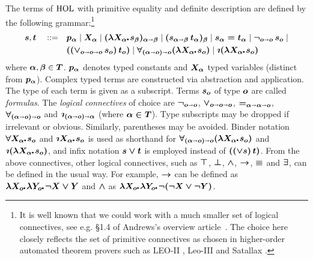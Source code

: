 \begin{definition}\label{holgrammar}
The terms of $\text{\textrm{HOL}}$ with primitive equality and
definite description are defined by the following
grammar:\footnote{It is well known that we could work with a much smaller set
  of logical connectives, see e.g. \S1.4 of Andrews's overview
  article~\cite{AndrewsSEP}. The choice here closely reflects the
  set of primitive connectives as chosen in higher-order automated theorem provers such
  as LEO-II \cite{LEO}, Leo-III \cite{Leo-III} and Satallax \cite{Satallax}.}
\begin{align*} 
  \hol{s},\hol{t} \quad ::= \quad & \hol{p_\alpha} \mid \hol{X_\alpha} \mid \hol{(\lam{X_\alpha}
  s_\beta)_{\alpha\ar\beta}} \mid \hol{(s_{\alpha\ar\beta}\,
                                    t_\alpha)_\beta} \mid
                                    \hol{s_\alpha = t_\alpha} \mid
                                    \hol{\neg_{o\ar o}\, s_o} \mid\\
  & \hol{(({\vee_{o\ar o\ar o}}\,s_o)\,t_o)} \mid \hol{\forall_{(\alpha\ar
    o)\ar o}(\lam{X_\alpha} s_o)} \mid \hol{\Descr(\lam{X_\alpha} s_o)}
\end{align*}
where $\boldsymbol{\alpha},\boldsymbol{\beta}\in \boldsymbol{T}$. $\boldsymbol{p_\alpha}$ denotes typed constants and
$\boldsymbol{X_\alpha}$ typed variables (distinct from $\boldsymbol{p_\alpha}$).  Complex typed
terms are constructed via abstraction and application. The type of
each term is given as a subscript.  Terms $\boldsymbol{s_o}$ of type $\boldsymbol{o}$ are called
\emph{formulas}.  The \emph{logical connectives} of choice are
$\boldsymbol{\neg_{o\shortrightarrow o}}$, $\boldsymbol{\vee_{o\shortrightarrow
  o\shortrightarrow o}}$, $\boldsymbol{=_{\alpha\shortrightarrow\alpha\shortrightarrow  o}}$, $\boldsymbol{\forall_{(\alpha\shortrightarrow
  o)\shortrightarrow o}}$ and $\hol{\Descr_{(\alpha\ar
  o)\ar \alpha}}$ (where $\boldsymbol{\alpha\in T}$).  Type subscripts may be dropped if
irrelevant or obvious. Similarly, parentheses may be avoided.  Binder
notation $\hol{\all{X_\alpha} s_o}$ and $\hol{\Descr {X_\alpha}\lambdot s_o}$ is used as shorthand for
$\hol{\forall_{(\alpha\ar o)\ar o}
(\lam{X_\alpha} s_o)}$ and $\hol{\Descr(\lam{X_\alpha} s_o)}$, and infix notation $\boldsymbol{s \vee t}$ is employed
instead of $\boldsymbol{((\vee s)\, t)}$. From the above connectives, other logical
connectives, such as $\boldsymbol{\top}$, $\boldsymbol{\bot}$, $\boldsymbol{\wedge}$,
$\boldsymbol{\rightarrow}$, $\boldsymbol{\equiv}$ and $\boldsymbol{\exists}$, can be defined in
the usual way. For example, $\boldsymbol{\rightarrow}$ can be defined as $\hol{\lam{X_o}\lam{Y_o}
  \neg X \vee Y}$ and $\boldsymbol{\wedge}$ as $\hol{\lam{X_o}\lam{Y_o}
  \neg (\neg X \vee \neg Y)}$.
\end{definition}

